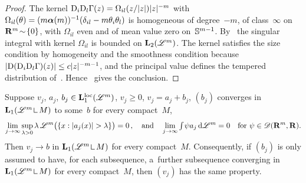 \documentclass[a4paper,twoside,leqno]{article}
\begin{document}
\begin{proof}
    The kernel $\mathrm{D}_i \mathrm{D}_l \Gamma(z) = \Omega_{il}(z/|z|) |z|^{-m}$ with $\Omega_{il}(\theta) = (m
    \boldsymbol{\alpha}(m))^{-1} (\delta_{il} - m \theta_i \theta_l)$ is homogeneous of degree~$-m$, of
    class~$\infty$ on $\mathbf{R}^m \!\sim\! \{0\}$, with $\Omega_{il}$ even and of mean value zero
    on~$\mathbb{S}^{m-1}$. By~\cite[Theorem~5.2.10]{Grafakos2014} the singular integral with
    kernel $\Omega_{il}$ is bounded on $\mathbf{L}_{2}(\mathscr{L}^m)$. The kernel satisfies the size condition
    \cite[(5.3.4)]{Grafakos2014} by homogeneity and the smoothness condition
    \cite[(5.3.12)]{Grafakos2014} because $|\mathrm{D}(\mathrm{D}_i \mathrm{D}_l \Gamma)(z)| \le c |z|^{-m-1}$, and the
    principal value defines the tempered distribution of~\cite[(5.3.7)]{Grafakos2014}.
    Hence~\cite[Theorem~5.3.3, (5.3.13)]{Grafakos2014} gives the conclusion.
\end{proof}

\begin{lemma}
    \label{ddg:3.3}
    Suppose $v_j$, $a_j$, $b_j \in \mathbf{L}_{1}^{\mathrm{loc}}(\mathscr{L}^m)$, $v_j \ge 0$, $v_j = a_j + b_j$, $(b_j)$
    converges in $\Lp{1}(\LM^m \restrict M)$ to some~$b$ for every compact~$M$,
    \begin{displaymath}
        \lim_{j \to \infty} \sup_{\lambda > 0} \lambda \, \mathscr{L}^m \bigl( \{ x : |a_j(x)| > \lambda
        \} \bigr) = 0 \,, \quad \text{and} \quad \lim_{j \to \infty} {\textstyle\int_{}^{}} \psi a_j \,\mathrm{d} \mathscr{L}^m
        = 0 \quad \text{for $\psi \in \mathscr{D}(\mathbf{R}^m,\mathbf{R})$}.
    \end{displaymath}
    Then $v_j \to b$ in $\Lp{1}(\LM^m \restrict M)$ for every compact~$M$. Consequently, if $(b_j)$
    is only assumed to have, for each subsequence, a~further subsequence converging in
    $\Lp{1}(\LM^m \restrict M)$ for every compact~$M$, then $(v_j)$ has the same property.
\end{lemma}
\end{document}
